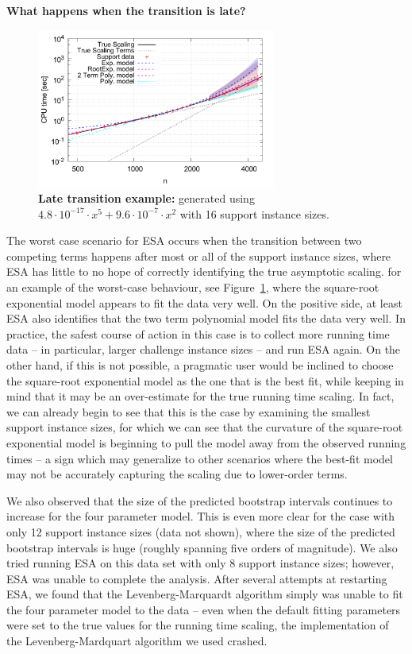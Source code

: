 \documentclass[aic]{iosart2x}
\begin{document}
\textbf{What happens when the transition is late?}
\begin{figure}[t]
\centering
\includegraphics[width=0.7\textwidth]{fittedModels-2-5-16-16s.pdf}
\caption{\textbf{Late transition example:} generated using $4.8\cdot 10^{-17} \cdot x^5 + 9.6\cdot 10^{-7} \cdot x^2$ with 16 support instance sizes.}
\label{fig:AA-competing-2-5-16-16s}
\end{figure}
The worst case scenario for ESA occurs when the transition between two competing terms happens after most or all of the support instance sizes, where ESA has little to no hope of correctly identifying the true asymptotic scaling. for an example of the worst-case behaviour, see Figure~\ref{fig:AA-competing-2-5-16-16s}, where the square-root exponential model appears to fit the data very well. On the positive side, at least ESA also identifies that the two term polynomial model fits the data very well. In practice, the safest course of action in this case is to collect more running time data -- in particular, larger challenge instance sizes -- and run ESA again. On the other hand, if this is not possible, a pragmatic user would be inclined to choose the square-root exponential model as the one that is the best fit, while keeping in mind that it may be an over-estimate for the true running time scaling. In fact, we can already begin to see that this is the case by examining the smallest support instance sizes, for which we can see that the curvature of the square-root exponential model is beginning to pull the model away from the observed running times -- a sign which may generalize to other scenarios where the best-fit model may not be accurately capturing the scaling due to lower-order terms. 

We also observed that the size of the predicted bootstrap intervals continues to increase for the four parameter model. This is even more clear for the case with only 12 support instance sizes (data not shown), where the size of the predicted bootstrap intervals is huge (roughly spanning five orders of magnitude). 
We also tried running ESA on this data set with only 8 support instance sizes; however, ESA was unable to complete the analysis. After several attempts at restarting ESA, we found that the Levenberg-Marquardt algorithm simply was unable to fit the four parameter model to the data -- even when the default fitting parameters were set to the true values for the running time scaling, the implementation of the Levenberg-Mardquart algorithm we used crashed. 
\end{document}
